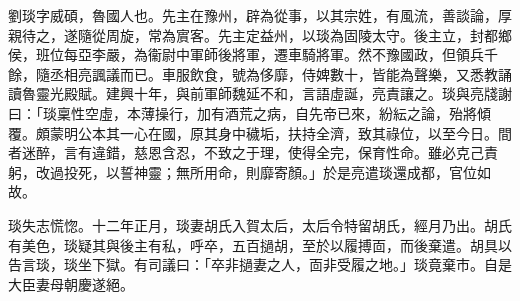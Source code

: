\begin{pinyinscope}
 
 
 劉琰字威碩，魯國人也。先主在豫州，辟為從事，以其宗姓，有風流，善談論，厚親待之，遂隨從周旋，常為賔客。先主定益州，以琰為固陵太守。後主立，封都鄉侯，班位每亞李嚴，為衞尉中軍師後將軍，遷車騎將軍。然不豫國政，但領兵千餘，隨丞相亮諷議而已。車服飲食，號為侈靡，侍婢數十，皆能為聲樂，又悉教誦讀魯靈光殿賦。建興十年，與前軍師魏延不和，言語虛誕，亮責讓之。琰與亮牋謝曰：「琰稟性空虛，本薄操行，加有酒荒之病，自先帝已來，紛紜之論，殆將傾覆。頗蒙明公本其一心在國，原其身中穢垢，扶持全濟，致其祿位，以至今日。間者迷醉，言有違錯，慈恩含忍，不致之于理，使得全完，保育性命。雖必克己責躬，改過投死，以誓神靈；無所用命，則靡寄顏。」於是亮遣琰還成都，官位如故。
 
 
 
 
 琰失志慌惚。十二年正月，琰妻胡氏入賀太后，太后令特留胡氏，經月乃出。胡氏有美色，琰疑其與後主有私，呼卒，五百撾胡，至於以履搏靣，而後棄遣。胡具以告言琰，琰坐下獄。有司議曰：「卒非撾妻之人，靣非受履之地。」琰竟棄市。自是大臣妻母朝慶遂絕。
 
 
\end{pinyinscope}